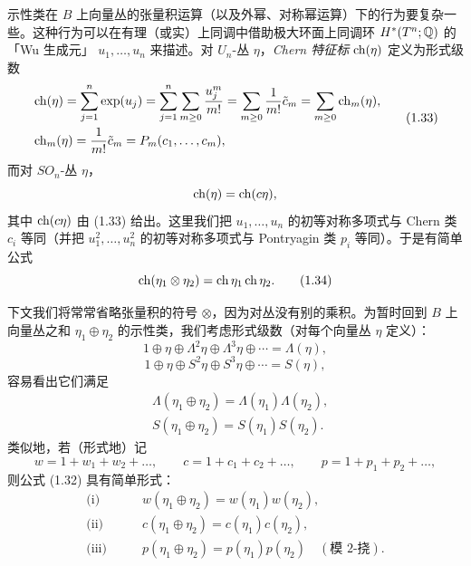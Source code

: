 示性类在 $B$ 上向量丛的张量积运算（以及外幂、对称幂运算）下的行为要复杂一些。这种行为可以在有理（或实）上同调中借助极大环面上同调环 $H^*(T^n;\mathbb{Q})$ 的「Wu 生成元」 $u_1,\ldots,u_n$ 来描述。对 $U_n$-丛 $\eta$，\emph{Chern 特征标} $\operatorname{ch}(\eta)$ 定义为形式级数
\begin{equation}
\begin{aligned}
&\operatorname{ch}(\eta)=\sum_{j=1}^n\exp(u_j)=\sum_{j=1}^n\sum_{m\ge0}\frac{u_j^m}{m!}=\sum_{m\ge0}\frac1{m!}\tilde c_m=\sum_{m\ge0}\operatorname{ch}_m(\eta),\\
&\operatorname{ch}_m(\eta)=\frac1{m!}\tilde c_m=P_m(c_1,\ldots,c_m),
\end{aligned}\tag{1.33}
\end{equation}
而对 $SO_n$-丛 $\eta$，
\[
\operatorname{ch}(\eta)=\operatorname{ch}(c\eta),
\]
其中 $\operatorname{ch}(c\eta)$ 由 (1.33) 给出。这里我们把 $u_1,\ldots,u_n$ 的初等对称多项式与 Chern 类 $c_i$ 等同（并把 $u_1^2,\ldots,u_n^2$ 的初等对称多项式与 Pontryagin 类 $p_i$ 等同）。于是有简单公式
\begin{equation}
\operatorname{ch}(\eta_1\otimes\eta_2)=\operatorname{ch}\eta_1\operatorname{ch}\eta_2. \tag{1.34}
\end{equation}

下文我们将常常省略张量积的符号 $\otimes$，因为对丛没有别的乘积。为暂时回到
$B$ 上向量丛之和 $\eta_1\oplus\eta_2$ 的示性类，我们考虑形式级数（对每个向量丛 $\eta$ 定义）：
\[
1\oplus\eta\oplus\Lambda^2\eta\oplus\Lambda^3\eta\oplus\cdots=\Lambda(\eta),
\]
\[
1\oplus\eta\oplus S^2\eta\oplus S^3\eta\oplus\cdots=S(\eta),
\]
容易看出它们满足
\begin{equation}
\begin{aligned}
&\Lambda(\eta_1\oplus\eta_2)=\Lambda(\eta_1)\Lambda(\eta_2),\\
&S(\eta_1\oplus\eta_2)=S(\eta_1)S(\eta_2).
\end{aligned}\tag{1.35}
\end{equation}
类似地，若（形式地）记
\[
w=1+w_1+w_2+\ldots,\qquad c=1+c_1+c_2+\ldots,\qquad p=1+p_1+p_2+\ldots,
\]
则公式 (1.32) 具有简单形式：
\[
\begin{aligned}
\text{(i)}&\qquad w(\eta_1\oplus\eta_2)=w(\eta_1)w(\eta_2),\\
\text{(ii)}&\qquad c(\eta_1\oplus\eta_2)=c(\eta_1)c(\eta_2),\\
\text{(iii)}&\qquad p(\eta_1\oplus\eta_2)=p(\eta_1)p(\eta_2)\quad(\text{模 2-挠}).
\end{aligned}
\]

